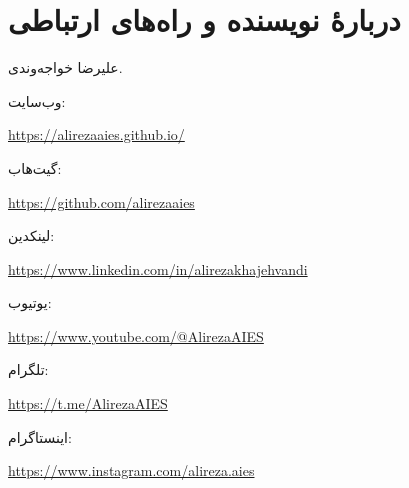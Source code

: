 \section*{دربارهٔ نویسنده و راه‌های ارتباطی}
علیرضا خواجه‌وندی.

وب‌سایت:
\begin{LTR}
\url{https://alirezaaies.github.io/}
\end{LTR}

گیت‌هاب:
\begin{LTR}
\url{https://github.com/alirezaaies}
\end{LTR}

لینکدین:
\begin{LTR}
\url{https://www.linkedin.com/in/alirezakhajehvandi}
\end{LTR}

یوتیوب:
\begin{LTR}
\url{https://www.youtube.com/@AlirezaAIES}
\end{LTR}

تلگرام:
\begin{LTR}
\url{https://t.me/AlirezaAIES}
\end{LTR}

اینستاگرام:
\begin{LTR}
\url{https://www.instagram.com/alireza.aies}
\end{LTR}
